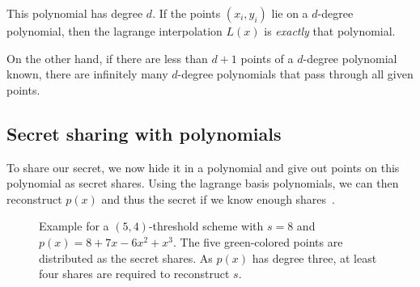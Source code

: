 This polynomial has degree $d$. If the points $(x_i, y_i)$ lie on a $d$-degree polynomial, then the lagrange interpolation $L(x)$ is \emph{exactly} that polynomial.

On the other hand, if there are less than $d+1$ points of a $d$-degree polynomial known, there are infinitely many $d$-degree polynomials that pass through all given points.~\cite{shamir_how_1979}


\subsection{Secret sharing with polynomials}
To share our secret, we now hide it in a polynomial and give out points on this polynomial as secret shares.
Using the lagrange basis polynomials, we can then reconstruct $p(x)$ and thus the secret if we know enough shares~\cite{shamir_how_1979}.

\begin{figure}
    \centering
    \caption[Plot of $(5,4)$-threshold secret sharing scheme]{
        Example for a $(5, 4)$-threshold scheme with $s=8$ and $p(x) = 8 + 7x - 6x^2 + x^3$.
        The five green-colored points are distributed as the secret shares.
        As $p(x)$ has degree three, at least four shares are required to reconstruct $s$.
    }
    \label{fig:sss}
\end{figure}

